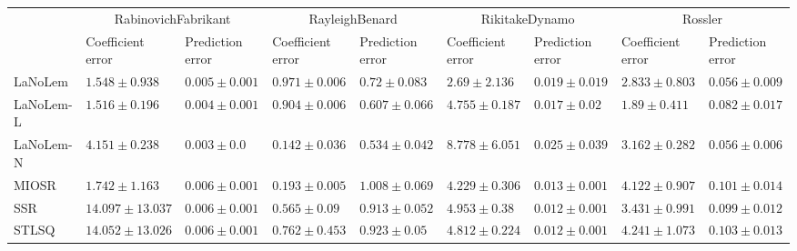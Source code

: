 \begin{table*}
{\begin{tabular}{lllllllll}
 & \multicolumn{2}{c}{RabinovichFabrikant} & \multicolumn{2}{c}{RayleighBenard} & \multicolumn{2}{c}{RikitakeDynamo} & \multicolumn{2}{c}{Rossler} \\
 & Coefficient error & Prediction error & Coefficient error & Prediction error & Coefficient error & Prediction error & Coefficient error & Prediction error \\
\midrule
LaNoLem & $1.548\pm 0.938$ & $0.005\pm 0.001$ & $0.971\pm 0.006$ & $0.72\pm 0.083$ & $\mathbf{2.69}\pm 2.136$ & $0.019\pm 0.019$ & $2.833\pm 0.803$ & $0.056\pm 0.009$ \\
LaNoLem-L & $\mathbf{1.516}\pm 0.196$ & $0.004\pm 0.001$ & $0.904\pm 0.006$ & $0.607\pm 0.066$ & $4.755\pm 0.187$ & $0.017\pm 0.02$ & $\mathbf{1.89}\pm 0.411$ & $0.082\pm 0.017$ \\
LaNoLem-N & $4.151\pm 0.238$ & $\mathbf{0.003}\pm 0.0$ & $\mathbf{0.142}\pm 0.036$ & $\mathbf{0.534}\pm 0.042$ & $8.778\pm 6.051$ & $0.025\pm 0.039$ & $3.162\pm 0.282$ & $\mathbf{0.056}\pm 0.006$ \\
MIOSR & $1.742\pm 1.163$ & $0.006\pm 0.001$ & $0.193\pm 0.005$ & $1.008\pm 0.069$ & $4.229\pm 0.306$ & $0.013\pm 0.001$ & $4.122\pm 0.907$ & $0.101\pm 0.014$ \\
SSR & $14.097\pm 13.037$ & $0.006\pm 0.001$ & $0.565\pm 0.09$ & $0.913\pm 0.052$ & $4.953\pm 0.38$ & $0.012\pm 0.001$ & $3.431\pm 0.991$ & $0.099\pm 0.012$ \\
STLSQ & $14.052\pm 13.026$ & $0.006\pm 0.001$ & $0.762\pm 0.453$ & $0.923\pm 0.05$ & $4.812\pm 0.224$ & $\mathbf{0.012}\pm 0.001$ & $4.241\pm 1.073$ & $0.103\pm 0.013$ \\

\midrule


\end{tabular}}
\end{table*}
